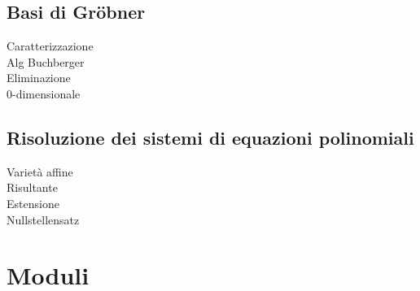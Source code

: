 \documentclass[a4paper,10pt]{article}
\theoremstyle{plain}
\theoremstyle{definition}
\begin{document}
\subsection{Basi di Gr\"obner}
Caratterizzazione\\
Alg Buchberger\\
Eliminazione\\
0-dimensionale\\

\subsection{Risoluzione dei sistemi di equazioni polinomiali}
Varietà affine\\
Risultante\\
Estensione\\
Nullstellensatz\\



\section{Moduli}
\end{document}
